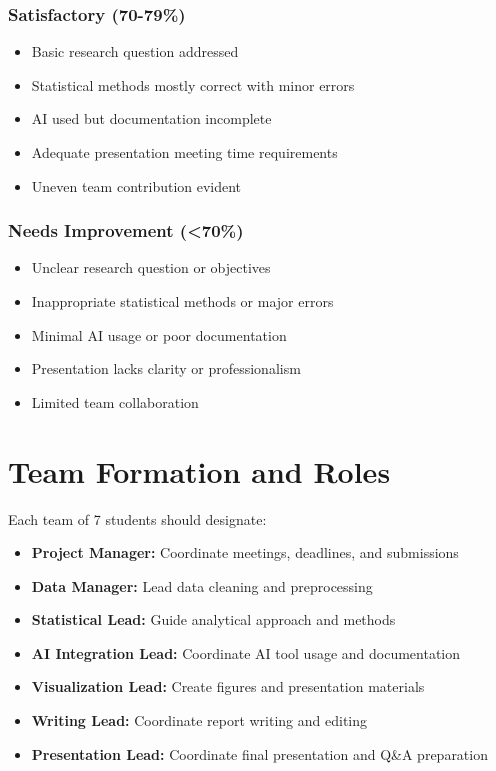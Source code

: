 \documentclass[11pt]{article}
\begin{document}
\subsubsection{Satisfactory (70-79\%)}
\begin{itemize}
\item Basic research question addressed
\item Statistical methods mostly correct with minor errors
\item AI used but documentation incomplete
\item Adequate presentation meeting time requirements
\item Uneven team contribution evident
\end{itemize}

\subsubsection{Needs Improvement (<70\%)}
\begin{itemize}
\item Unclear research question or objectives
\item Inappropriate statistical methods or major errors
\item Minimal AI usage or poor documentation
\item Presentation lacks clarity or professionalism
\item Limited team collaboration
\end{itemize}

\section{Team Formation and Roles}

Each team of 7 students should designate:
\begin{itemize}
\item \textbf{Project Manager:} Coordinate meetings, deadlines, and submissions
\item \textbf{Data Manager:} Lead data cleaning and preprocessing
\item \textbf{Statistical Lead:} Guide analytical approach and methods
\item \textbf{AI Integration Lead:} Coordinate AI tool usage and documentation
\item \textbf{Visualization Lead:} Create figures and presentation materials
\item \textbf{Writing Lead:} Coordinate report writing and editing
\item \textbf{Presentation Lead:} Coordinate final presentation and Q\&A preparation
\end{itemize}
\end{document}

